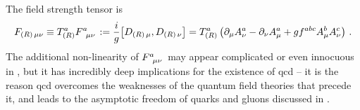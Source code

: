 The field strength tensor is
\begin{align}
    \label{eq:non-abelian-field-strength}
    F_{(R)\,\mu\nu}
    \equiv
    T^a_{(R)}
    F\indices{^a_{\mu\nu}}
    :=
    \frac{i}{g}
    \comm{D_{(R)\,\mu}}{D_{(R)\,\nu}}
    =
    T^a_{(R)}
    \le(
        \partial_\mu A^a_\nu - \partial_\nu A^a_\mu
        + g f^{abc} A^b_\mu A^c_\nu
    \ri)
    \,.
\end{align}
The additional non-linearity of \(F\indices{^a_{\mu\nu}}\) may appear complicated or even innocuous in , but it has incredibly deep implications for the existence of \gls{qcd} -- it is the reason \gls{qcd} overcomes the weaknesses of the quantum field theories that precede it, and leads to the asymptotic freedom of quarks and gluons discussed in .


